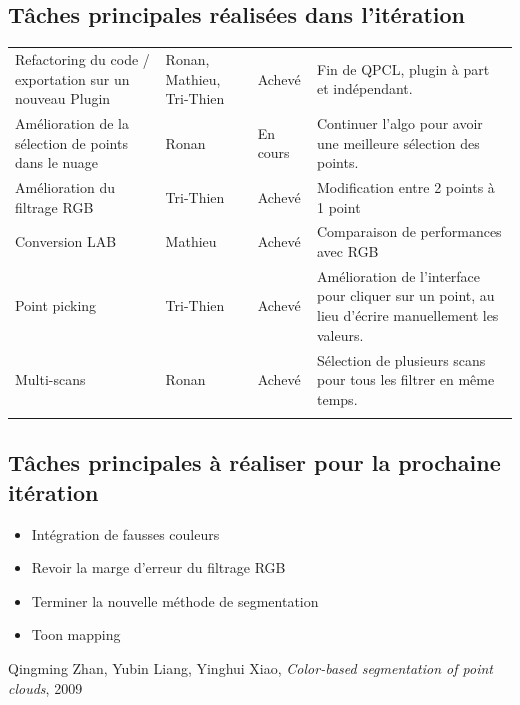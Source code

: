 \documentclass[12pt,titlepage,french]{article}
\begin{document}
\subsection{Tâches principales réalisées dans l'itération}
\noindent\begin{tabu} to \toprule
  &&&\\\toprule
Refactoring du code / exportation sur un nouveau Plugin
& Ronan, Mathieu, Tri-Thien
& Achevé
& Fin de QPCL, plugin à part et indépendant.\\\midrule
Amélioration de la sélection de points dans le nuage
& Ronan
& En cours
& Continuer l'algo pour avoir une meilleure sélection des points.\\\midrule
Amélioration du filtrage RGB
& Tri-Thien
& Achevé
& Modification entre 2 points à 1 point \\\midrule
Conversion LAB
& Mathieu
& Achevé
& Comparaison de performances avec RGB\\\midrule
Point picking
& Tri-Thien
& Achevé
& Amélioration de l'interface pour cliquer sur un point, au lieu d'écrire manuellement les valeurs.\\\midrule
Multi-scans
& Ronan
& Achevé
& Sélection de plusieurs scans pour tous les filtrer en même temps.\\\bottomrule  \\
\end{tabu}

\subsection{Tâches principales à réaliser pour la prochaine itération}
\begin{itemize}
  \item Intégration de fausses couleurs
  \item Revoir la marge d'erreur du filtrage RGB
  \item Terminer la nouvelle méthode de segmentation
  \item Toon mapping
\end{itemize}
\begin{thebibliography}{3}

 Qingming Zhan, Yubin Liang, Yinghui Xiao, \textit{Color-based segmentation of point clouds}, 2009
\end{thebibliography}
\end{document}
